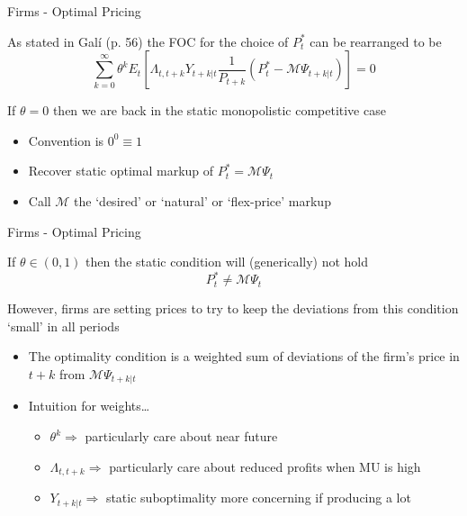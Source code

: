 \documentclass{beamer}
\begin{document}
\begin{frame}{Firms - Optimal Pricing}

As stated in Gal\'i (p. 56) the FOC for the choice of $P_{t}^{\ast}$ can be rearranged to be
\begin{equation}
\sum\limits_{k=0}^{\infty} \theta^{k} E_{t} \left[ \Lambda_{t,t+k} Y_{t+k|t} \frac{1}{P_{t+k}} \left( P_{t}^{\ast} - \mathcal{M} \Psi_{t+k|t}  \right) \right] = 0 \label{eqn:opt_price_cond}
\end{equation}

\vspace{3mm}
If $\theta=0$ then we are back in the static monopolistic competitive case
\begin{itemize}
\item	Convention is $0^{0}\equiv1$
\item	Recover static optimal markup of $P_{t}^{\ast}=\mathcal{M}  \Psi_{t}$
\item	Call $\mathcal{M}$ the `desired' or `natural' or `flex-price' markup
\end{itemize}
	
\end{frame}


	
\begin{frame}{Firms - Optimal Pricing}

If $\theta \in (0,1)$ then the static condition will (generically) not hold
\[
P_{t}^{\ast}\neq\mathcal{M}  \Psi_{t}
\]

However, firms are setting prices to try to keep the deviations from this condition `small' in all periods
\begin{itemize}
\item	The optimality condition is a weighted sum of deviations of the firm's price in $t+k$ from $\mathcal{M}  \Psi_{t+k|t}$
\item	Intuition for weights\ldots
	\begin{itemize}
	\item	$\theta^{k}\Rightarrow$ particularly care about near future
	\item	$\Lambda_{t,t+k}\Rightarrow$ particularly care about reduced profits when MU is high
	\item	$Y_{t+k|t}\Rightarrow$ static suboptimality more concerning if producing a lot
	\end{itemize}
\end{itemize}

\end{frame}
\end{document}
